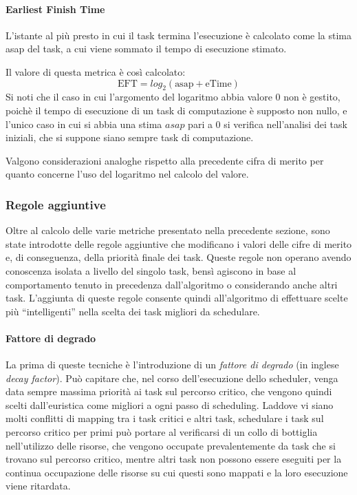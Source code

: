 \paragraph{Earliest Finish Time}
L'istante al più presto in cui il task termina l'esecuzione è calcolato come la 
stima asap del task, a cui viene sommato il tempo di esecuzione stimato.

Il valore di questa metrica è così calcolato:
\begin{equation}
  \text{EFT} = log_2\left(\text{asap} + \text{eTime}\right)
\end{equation}
Si noti che il caso in cui l'argomento del logaritmo abbia valore $0$ non è 
gestito, poichè il tempo di esecuzione di un task di computazione è supposto 
non nullo, e l'unico caso in cui si abbia una stima $asap$ pari a $0$ si 
verifica nell'analisi dei task iniziali, che si suppone siano sempre task di 
computazione.

Valgono considerazioni analoghe rispetto alla precedente cifra di merito 
per quanto concerne l'uso del logaritmo nel calcolo del valore.

\subsubsection{Regole aggiuntive}
Oltre al calcolo delle varie metriche presentato nella precedente sezione, sono 
state introdotte delle regole aggiuntive che modificano i valori delle cifre di 
merito e, di conseguenza, della priorità finale dei task. Queste regole non 
operano avendo conoscenza isolata a livello del singolo task, bensì agiscono in 
base al comportamento tenuto in precedenza dall'algoritmo o considerando anche 
altri task. L'aggiunta di queste regole consente quindi all'algoritmo di 
effettuare scelte più ``intelligenti'' nella scelta dei task migliori da 
schedulare.

\paragraph{Fattore di degrado}
La prima di queste tecniche è l'introduzione di un \emph{fattore di degrado} 
(in inglese \emph{decay factor}). Può capitare che, nel corso dell'esecuzione 
dello scheduler, venga data sempre massima priorità ai task sul percorso 
critico, che vengono quindi scelti dall'euristica come migliori a ogni passo di 
scheduling. Laddove vi siano molti conflitti di mapping tra i task critici
e altri task, schedulare i task sul percorso critico per primi
può portare al verificarsi di un collo di bottiglia nell'utilizzo delle 
risorse, che vengono occupate prevalentemente da task che si trovano sul 
percorso critico, mentre altri task non possono essere eseguiti per la continua 
occupazione delle risorse su cui questi sono mappati e la loro esecuzione viene
ritardata.

